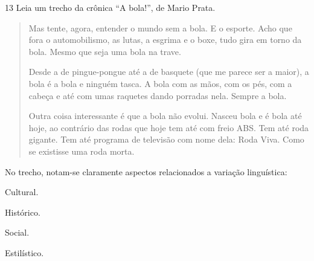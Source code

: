 \num{13} Leia um trecho da crônica ``A bola!'', de Mario Prata.

\begin{quote}
\noindent Mas tente, agora, entender o mundo sem a bola. E o esporte. Acho que
fora o automobilismo, as lutas, a esgrima e o boxe, tudo gira em torno
da bola. Mesmo que seja uma bola na trave.

Desde a de pingue-pongue até a de basquete (que me parece ser a maior),
a bola é a bola e ninguém tasca. A bola com as mãos, com os pés, com a
cabeça e até com umas raquetes dando porradas nela. Sempre a bola.

Outra coisa interessante é que a bola não evolui. Nasceu bola e é bola
até hoje, ao contrário das rodas que hoje tem até com freio ABS. Tem até
roda gigante. Tem até programa de televisão com nome dela: Roda Viva.
Como se existisse uma roda morta.

\end{quote}

\noindent No trecho, notam-se claramente aspectos relacionados a variação
linguística:

\begin{escolha}
\item Cultural.
\item Histórico.
\item Social.
\item Estilístico.
\end{escolha}



